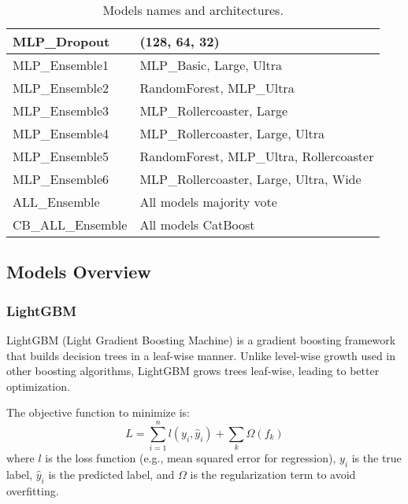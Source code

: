 \begin{table}[h!]
\begin{tabular}{|l|l|}
        MLP\_Dropout            & (128, 64, 32)                                         \\ \hline
        MLP\_Ensemble1          & MLP\_Basic, Large, Ultra                    \\ \hline
        MLP\_Ensemble2          & RandomForest, MLP\_Ultra                              \\ \hline
        MLP\_Ensemble3          & MLP\_Rollercoaster, Large                        \\ \hline
        MLP\_Ensemble4          & MLP\_Rollercoaster, Large, Ultra            \\ \hline
        MLP\_Ensemble5          & RandomForest, MLP\_Ultra, Rollercoaster          \\ \hline
        MLP\_Ensemble6          & MLP\_Rollercoaster, Large, Ultra, Wide \\ \hline
        ALL\_Ensemble           & All models majority vote                              \\ \hline
        CB\_ALL\_Ensemble       & All models CatBoost                                   \\ \hline
    \end{tabular}
    \caption{Models names and architectures.}
    \label{tab:models}
\end{table}


\subsection{Models Overview}

\subsubsection{LightGBM}
LightGBM (Light Gradient Boosting Machine) is a gradient boosting framework that builds decision trees in a leaf-wise manner. Unlike level-wise growth used in other boosting algorithms, LightGBM grows trees leaf-wise, leading to better optimization.

The objective function to minimize is:
\begin{equation*}
L = \sum_{i=1}^{n} l(y_i, \hat{y}_i) + \sum_{k} \Omega(f_k)
\end{equation*}
where $l$ is the loss function (e.g., mean squared error for regression), $y_i$ is the true label, $\hat{y}_i$ is the predicted label, and $\Omega$ is the regularization term to avoid overfitting.

